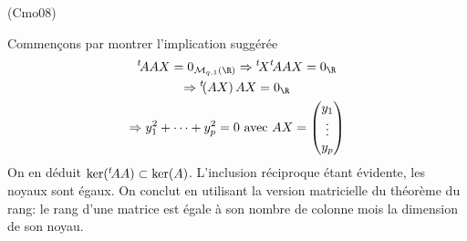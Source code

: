 \begin{tiny}(Cmo08)\end{tiny} Commençons par montrer l'implication suggérée
\begin{multline*}
  \mathstrut^t\!AAX = 0_{\mathcal M_{q,1}(\R)}
  \Rightarrow \mathstrut^t\!X\mathstrut^t\!AAX = 0_{\R}\\
  \Rightarrow \mathstrut^t\!(AX)\,AX = 0_{\R} \\
  \Rightarrow y_1^2+\cdots + y_p^2 = 0 
  \text{ avec } AX =
\begin{pmatrix}
  y_1\\\vdots \\ y_p
\end{pmatrix}
\end{multline*}
On en déduit $\ker(\mathstrut^t\!AA) \subset \ker(A)$.\newline
L'inclusion réciproque étant évidente, les noyaux sont égaux. On conclut en utilisant la version matricielle du théorème du rang: le rang d'une matrice est égale à son nombre de colonne mois la dimension de son noyau. 